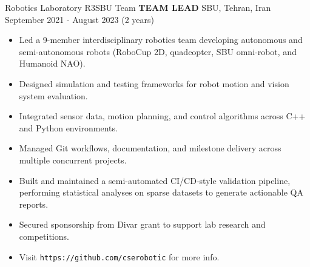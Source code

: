             
\begin{cventries}
    \cventry
    {Robotics Laboratory \textemdash R3SBU Team}
    {\textbf{TEAM LEAD}}
    {SBU, Tehran, Iran}
    {September 2021 - August 2023 (2 years)}
    {
        \begin{itemize}
            \item Led a 9-member interdisciplinary robotics team developing autonomous and semi-autonomous robots (RoboCup 2D, quadcopter, SBU omni-robot, and Humanoid NAO).
            \item Designed simulation and testing frameworks for robot motion and vision system evaluation.
            \item Integrated sensor data, motion planning, and control algorithms across C++ and Python environments.
            \item Managed Git workflows, documentation, and milestone delivery across multiple concurrent projects.
            \item Built and maintained a semi-automated CI/CD-style validation pipeline, performing statistical analyses on sparse datasets to generate actionable QA reports.
            \item Secured sponsorship from Divar grant to support lab research and competitions.
            \item Visit \texttt{https://github.com/cserobotic} for more info.
        \end{itemize}
        }
\end{cventries}
                
